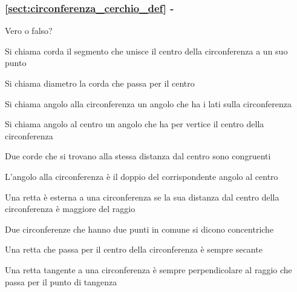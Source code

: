 \begingroup
\hypersetup{linkcolor=black}
\subsubsection*{\ref{sect:circonferenza_cerchio_def} - 
}
\endgroup

\begin{esercizio}
\label{ese:5.5}
Vero o falso?
\begin{enumeratea}
\item Si chiama corda il segmento che unisce il centro della 
circonferenza a un suo punto\tab\hfill\boxV\quad\boxF
\item Si chiama diametro la corda che passa per il 
centro\hfill\boxV\quad\boxF
\item Si chiama angolo alla circonferenza un angolo che ha i lati 
sulla circonferenza\hfill\boxV\quad\boxF
\item Si chiama angolo al centro un angolo che ha per vertice il 
centro della circonferenza\tab\hfill\boxV\quad\boxF
\item Due corde che si trovano alla stessa distanza dal centro sono 
congruenti\hfill\boxV\quad\boxF
\item L'angolo alla circonferenza è il doppio del corrispondente 
angolo al centro\hfill\boxV\quad\boxF
\item Una retta è esterna a una circonferenza se la sua distanza dal 
centro della circonferenza è maggiore del raggio\hfill\boxV\quad\boxF
\item Due circonferenze che hanno due punti in comune si dicono 
concentriche\hfill\boxV\quad\boxF
\item Una retta che passa per il centro della circonferenza è sempre 
secante\hfill\boxV\quad\boxF
\item Una retta tangente a una circonferenza è sempre perpendicolare 
al raggio che passa per il punto di tangenza\hfill\boxV\quad\boxF
\end{enumeratea}
\end{esercizio}

